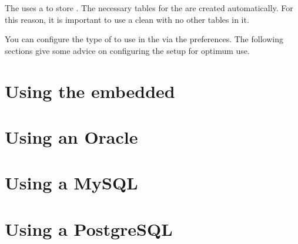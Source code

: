 The \ite{}  uses a \gddb{} to store \gdprojects{}. The necessary tables for the \gddb{} are created automatically. For this reason, it is important to use a clean \gddb{} with no other tables in it.

You can configure the type of \gddb{} to use in the \ite{} via the preferences. The following sections give some advice on configuring the \gddb{} setup for optimum use.

\section{Using the embedded \gddb{}}


\section{Using an Oracle \gddb{}}


\section{Using a MySQL \gddb{}}


\section{Using a PostgreSQL \gddb{}}

